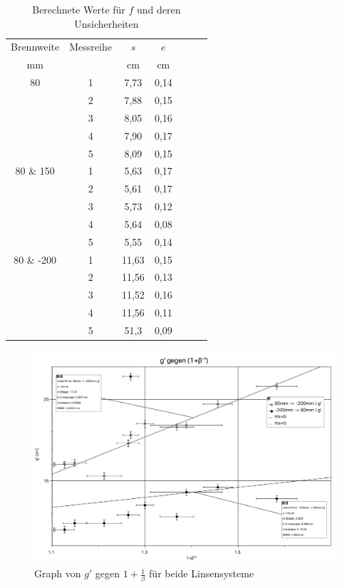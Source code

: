 \documentclass[11pt,a4paper]{article}
\begin{document}
\begin{table}[h]
	\centering
	\begin{tabular*}{0.50\textwidth}{@{\extracolsep{\fill}}cc|ccccc}
		\toprule
		Brennweite & Messreihe & $s$ & $e$   \\
		mm &  & cm & cm  \\
		\bottomrule
		80 & 1 & 7,73 & 0,14 \\
		& 2 & 7,88 & 0,15 \\
		& 3 & 8,05 & 0,16 \\
		& 4 & 7,90 & 0,17 \\
		& 5 & 8,09 & 0,15 \\
		80 \& 150 & 1 & 5,63 & 0,17 \\
		& 2 & 5,61 & 0,17 \\
		& 3 & 5,73 & 0,12 \\
		& 4 & 5,64 & 0,08 \\
		& 5 & 5,55 & 0,14 \\
		80 \& -200 & 1 & 11,63 &0,15 \\
		& 2 & 11,56 & 0,13 \\
		& 3 & 11,52 & 0,16 \\
		& 4 & 11,56 & 0,11 \\
		& 5 & 51,3 & 0,09 \\
		\bottomrule
	\end{tabular*}
	\caption{Berechnete Werte für $f$ und deren Unsicherheiten}
\end{table}

\begin{figure}[h]
	\centering
	\includegraphics[width=\linewidth]{Abb4}
	\caption{Graph von $g'$ gegen $1+\frac{1}{\beta}$ für beide Linsensysteme}
\end{figure}
\end{document}
